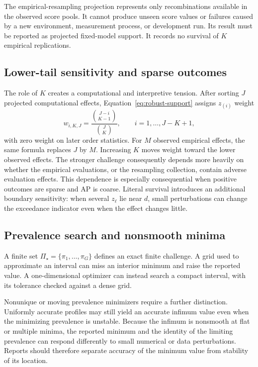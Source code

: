 \documentclass[11pt]{article}
\newcommand{\PSet}{\Pi_\star}
\theoremstyle{remark}
\begin{document}
The empirical-resampling projection represents only recombinations available in the observed score pools. It cannot produce unseen score values or failures caused by a new environment, measurement process, or development run. Its result must be reported as projected fixed-model support. It records no survival of $K$ empirical replications.

\subsection{Lower-tail sensitivity and sparse outcomes}

The role of $K$ creates a computational and interpretive tension. After sorting $J$ projected computational effects, Equation~\eqref{eq:robust-support} assigns $z_{(i)}$ weight
\[
w_{i,K,J}
=
\frac{\binom{J-i}{K-1}}{\binom{J}{K}},
\qquad i=1,\ldots,J-K+1,
\]
with zero weight on later order statistics. For $M$ observed empirical
effects, the same formula replaces $J$ by $M$.
Increasing $K$ moves weight toward the lower observed effects. The stronger challenge consequently depends more heavily on whether the empirical evaluations, or the resampling collection, contain adverse evaluation effects. This dependence is especially consequential when positive outcomes are sparse and AP is coarse. Literal survival introduces an additional boundary sensitivity: when several $z_\ell$ lie near $d$, small perturbations can change the exceedance indicator even when the effect changes little.

\subsection{Prevalence search and nonsmooth minima}

A finite set $\PSet=\{\pi_1,\ldots,\pi_G\}$ defines an exact finite challenge. A grid used to approximate an interval can miss an interior minimum and raise the reported value. A one-dimensional optimizer can instead search a compact interval, with its tolerance checked against a dense grid.

Nonunique or moving prevalence minimizers require a further distinction. Uniformly accurate profiles may still yield an accurate infimum value even when the minimizing prevalence is unstable. Because the infimum is nonsmooth at flat or multiple minima, the reported minimum and the identity of the limiting prevalence can respond differently to small numerical or data perturbations. Reports should therefore separate accuracy of the minimum value from stability of its location.
\end{document}
